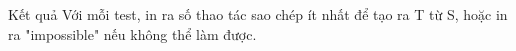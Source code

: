 Kết quả
Với mỗi test, in ra số thao tác sao chép ít nhất để tạo ra T từ S, hoặc in ra "impossible" nếu không thể làm được.